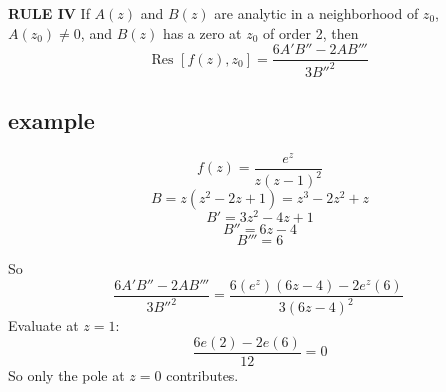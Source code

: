 \documentclass[11pt, oneside]{article}
\begin{document}
\textbf{RULE IV}  If $A(z)$ and $B(z)$ are analytic in a neighborhood of $z_0$, $A(z_0) \ne 0$, and $B(z)$ has a zero at $z_0$ of order 2, then
\[ \text{Res } [f(z),z_0] = \frac{6A' B'' - 2AB'''}{3B''^2} \]

\subsection*{example}

\label{sec:ex30R}

\[ f(z) = \frac{e^z}{z(z-1)^2} \]
\[ B = z(z^2 - 2z + 1) = z^3 - 2z^2 + z \]
\[ B' = 3z^2 - 4z + 1 \]
\[ B'' = 6z - 4 \]
\[ B''' = 6 \]

So
\[ \frac{6A' B'' - 2AB'''}{3B''^2} = \frac{6(e^z)(6z-4) - 2e^z(6)}{3(6z-4)^2} \ \]
Evaluate at $z=1$:
\[ \frac{6e(2) - 2e(6)}{12} = 0 \]
So only the pole at $z=0$ contributes.
\end{document}
